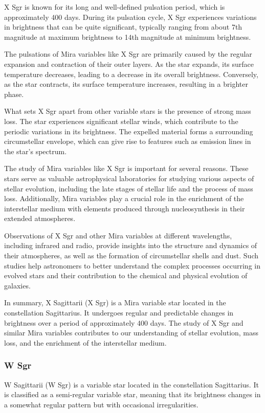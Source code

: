 X Sgr is known for its long and well-defined pulsation period, which is approximately 400 days. During its pulsation cycle, X Sgr experiences variations in brightness that can be quite significant, typically ranging from about 7th magnitude at maximum brightness to 14th magnitude at minimum brightness.

The pulsations of Mira variables like X Sgr are primarily caused by the regular expansion and contraction of their outer layers. As the star expands, its surface temperature decreases, leading to a decrease in its overall brightness. Conversely, as the star contracts, its surface temperature increases, resulting in a brighter phase.

What sets X Sgr apart from other variable stars is the presence of strong mass loss. The star experiences significant stellar winds, which contribute to the periodic variations in its brightness. The expelled material forms a surrounding circumstellar envelope, which can give rise to features such as emission lines in the star's spectrum.

The study of Mira variables like X Sgr is important for several reasons. These stars serve as valuable astrophysical laboratories for studying various aspects of stellar evolution, including the late stages of stellar life and the process of mass loss. Additionally, Mira variables play a crucial role in the enrichment of the interstellar medium with elements produced through nucleosynthesis in their extended atmospheres.

Observations of X Sgr and other Mira variables at different wavelengths, including infrared and radio, provide insights into the structure and dynamics of their atmospheres, as well as the formation of circumstellar shells and dust. Such studies help astronomers to better understand the complex processes occurring in evolved stars and their contribution to the chemical and physical evolution of galaxies.

In summary, X Sagittarii (X Sgr) is a Mira variable star located in the constellation Sagittarius. It undergoes regular and predictable changes in brightness over a period of approximately 400 days. The study of X Sgr and similar Mira variables contributes to our understanding of stellar evolution, mass loss, and the enrichment of the interstellar medium.

\subsubsection*{ W Sgr }
W Sagittarii (W Sgr) is a variable star located in the constellation Sagittarius. It is classified as a semi-regular variable star, meaning that its brightness changes in a somewhat regular pattern but with occasional irregularities.

